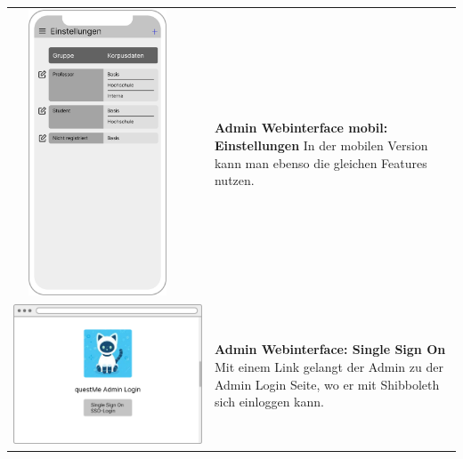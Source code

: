\begin{tabular}{C{6cm}  L{7cm}}
    \includegraphics[width=5cm,height=8.5cm]{bilder/new vers. UI Design/Einstellungen/iPhone X Einstellungen I (1).png} & \textbf{Admin Webinterface mobil: Einstellungen} \newline 
    In der mobilen Version kann man ebenso die gleichen Features nutzen. \\
    \includegraphics[width=\linewidth]{bilder/new vers. UI Design/Login SSO/Admin Interface SSO.png} & \textbf{Admin Webinterface: Single Sign On} \newline 
    Mit einem Link gelangt der Admin zu der Admin Login Seite, wo er mit Shibboleth sich einloggen kann. \\

\end{tabular}
